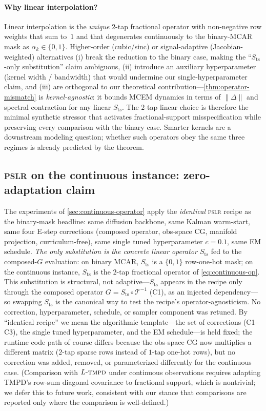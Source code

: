 \documentclass{article}
\theoremstyle{plain}
\theoremstyle{definition}
\theoremstyle{remark}
\newcommand{\imgts}{\mathcal{T}^{-1}}
\newcommand{\pslr}{\textsc{pslr}}
\newcommand{\ltmpd}{L\mbox{-}\textsc{tmpd}}
\begin{document}
\paragraph{Why linear interpolation?}
Linear interpolation is the \emph{unique} $2$-tap fractional operator with non-negative row weights that sum to~$1$ and that degenerates continuously to the binary-MCAR mask as $\alpha_k \in \{0, 1\}$. Higher-order (cubic/sinc) or signal-adaptive (Jacobian-weighted) alternatives (i) break the reduction to the binary case, making the ``$S_{\mathrm{ts}}$-only substitution'' claim ambiguous, (ii) introduce an auxiliary hyperparameter (kernel width / bandwidth) that would undermine our single-hyperparameter claim, and (iii) are orthogonal to our theoretical contribution---\cref{thm:operator-mismatch} is \emph{kernel-agnostic}: it bounds MCEM dynamics in terms of $\|\Delta\|$ and spectral contraction for any linear $S_{\mathrm{ts}}$. The $2$-tap linear choice is therefore the minimal synthetic stressor that activates fractional-support misspecification while preserving every comparison with the binary case. Smarter kernels are a downstream modeling question; whether such operators obey the same three regimes is already predicted by the theorem.

\subsection{\pslr{} on the continuous instance: zero-adaptation claim}
\label{app:continuous-adaptation}

The experiments of \cref{sec:continuous-operator} apply the \emph{identical} \pslr{} recipe as the binary-mask headline: same diffusion backbone, same Kalman warm-start, same four E-step corrections (composed operator, obs-space CG, manifold projection, curriculum-free), same single tuned hyperparameter $c = 0.1$, same EM schedule. \emph{The only substitution is the concrete linear operator $S_{\mathrm{ts}}$} fed to the composed-$G$ evaluation: on binary MCAR, $S_{\mathrm{ts}}$ is a $\{0,1\}$ row-one-hot mask; on the continuous instance, $S_{\mathrm{ts}}$ is the $2$-tap fractional operator of \cref{eq:continuous-op}. This substitution is structural, not adaptive---$S_{\mathrm{ts}}$ appears in the recipe only through the composed operator $G = S_{\mathrm{ts}} \circ \imgts$ (C1), as an injected dependency---so swapping $S_{\mathrm{ts}}$ is the canonical way to test the recipe's operator-agnosticism. No correction, hyperparameter, schedule, or sampler component was retuned. By ``identical recipe'' we mean the algorithmic template---the set of corrections (C1--C3), the single tuned hyperparameter, and the EM schedule---is held fixed; the runtime code path of course differs because the obs-space CG now multiplies a different matrix ($2$-tap sparse rows instead of $1$-tap one-hot rows), but no correction was added, removed, or parameterized differently for the continuous case. (Comparison with $\ltmpd$ under continuous observations requires adapting TMPD's row-sum diagonal covariance to fractional support, which is nontrivial; we defer this to future work, consistent with our stance that comparisons are reported only where the comparison is well-defined.)
\end{document}
